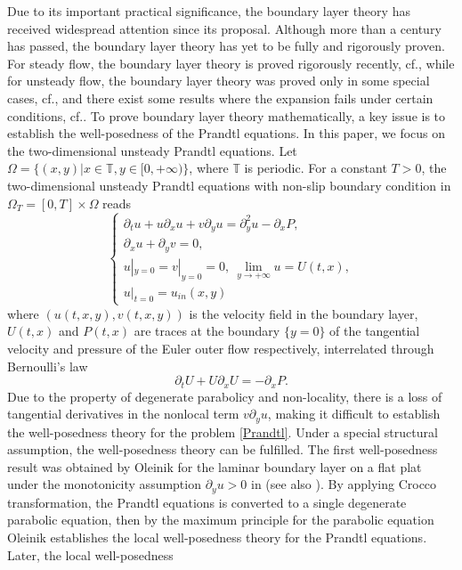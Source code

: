 \documentclass{amsart}
\numberwithin{equation}{section}
\begin{document}
Due to its important practical significance, the boundary layer theory has received widespread attention since its proposal.
Although more than a century has passed, the boundary layer theory has yet to be fully and rigorously proven. For steady flow, the boundary layer theory is proved rigorously recently, cf.\cite{GM1,GI,GN-2,GZ,I}, while for unsteady flow, the boundary layer theory was proved only in some special cases, cf.\cite{Lop,LW,SC2,WWZ,Mae,GMM}, and there exist some results where the expansion fails under certain conditions, cf.\cite{Grenier,GN1,GN2,GGN,GN-1}. To prove boundary layer theory mathematically, a key issue is to establish the well-posedness of the Prandtl equations. In this paper, we focus on the two-dimensional unsteady Prandtl equations. Let $\Omega=\{(x,y)|x\in\mathbb{T},y\in[0,+\infty)\}$, where $\mathbb{T}$ is periodic. For a constant $T>0$, the two-dimensional unsteady Prandtl equations with non-slip boundary condition in $\Omega_{T}=[0,T]\times\Omega$ reads
\begin{equation}\label{Prandtl}
\begin{cases}
\partial_{t}u+u\partial_{x}u+v\partial_{y}u=\partial_{y}^{2}u-\partial_{x}P,\\
\partial_{x}u+\partial_{y}v=0,\\
u|_{y=0}=v|_{y=0}=0,~\lim\limits_{y\to+\infty} u=U(t,x),\\
u|_{t=0}=u_{in}(x,y)
\end{cases}
\end{equation}
where $(u(t,x,y),v(t,x,y))$ is the velocity field in the boundary layer, $U(t,x)$ and $P(t,x)$ are traces at the boundary $\{y=0\}$ of the tangential velocity and pressure of the Euler outer flow respectively, interrelated through Bernoulli's law
\begin{equation}\label{B}
\partial_{t}U+U\partial_{x}U=-\partial_{x}P.
\end{equation}
Due to the property of degenerate parabolicy and non-locality, there is a loss of tangential derivatives in the nonlocal term $v\partial_{y}u$, making it difficult to establish the well-posedness theory for the problem \eqref{Prandtl}. Under a special structural assumption, the well-posedness theory can be fulfilled. The first well-posedness result was obtained by Oleinik for the laminar boundary layer on a flat plat under the monotonicity assumption $\partial_{y}u>0$ in \cite{Oleinik}(see also \cite{Ole}). By applying Crocco transformation, the Prandtl equations is converted to a single degenerate parabolic equation, then by the maximum principle for the parabolic equation Oleinik  establishes the local well-posedness theory for the Prandtl equations. Later, the local well-posedness
\end{document}
